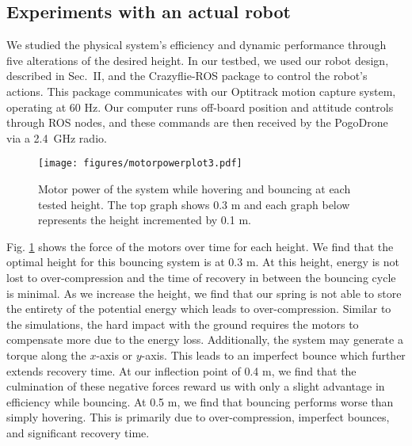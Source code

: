 \documentclass[letterpaper,10pt,conference]{ieeeconf}
\newcommand{\david}[1]{{\color{blue}#1}}
\begin{document}
\subsection{Experiments with an actual robot}


We studied the physical system's efficiency and dynamic performance through five alterations of the desired height.
%
In our testbed, we used our robot design, described in Sec.~II, and the Crazyflie-ROS package to control the robot's actions. This package communicates with our Optitrack motion capture system, operating at 60 Hz. Our computer runs off-board position and attitude controls through ROS nodes, and these commands are then received by the PogoDrone via a 2.4~GHz radio.
\label{sec:Experiments}
\begin{figure}[t!]
    \texttt{[image: figures/motorpowerplot3.pdf]}
    \caption{Motor power of the system while hovering and bouncing at each tested height. The top graph shows 0.3 m and each graph below represents the height incremented by 0.1 m.}
    \label{fig:motorpower}
\end{figure}
%
Fig. \ref{fig:motorpower} shows the force of the motors over time for each height. We find that the optimal height for this bouncing system is at 0.3 m. At this height, energy is not lost to over-compression and the time of recovery in between the bouncing cycle is minimal. As we increase the height, we find that our spring is not able to store the entirety of the potential energy which leads to over-compression. Similar to the simulations, the hard impact with the ground requires the motors to compensate more due to the energy loss. Additionally, the system may generate a torque along the $x$-axis or $y$-axis. This leads to an imperfect bounce which further extends recovery time. At our inflection point of 0.4 m, we find that the culmination of these negative forces reward us with only a slight advantage in efficiency while bouncing.
At 0.5 m, we find that bouncing performs worse than simply hovering. This is primarily due to over-compression, imperfect bounces, and significant recovery time. 
\end{document}
